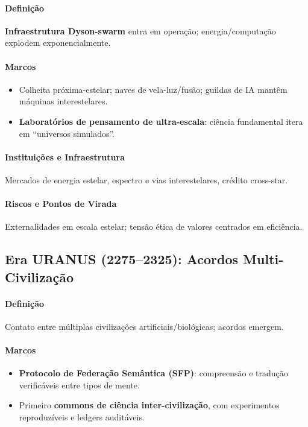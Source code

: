 \documentclass[11pt]{article}
\begin{document}
\begin{itemize}[noitemsep]
\begin{itemize}[noitemsep]
\begin{itemize}[noitemsep]
\paragraph{Definição} \textbf{Infraestrutura Dyson-swarm} entra em operação; energia/computação explodem exponencialmente.

\paragraph{Marcos}
\begin{itemize}[noitemsep]
  \item Colheita próxima-estelar; naves de vela-luz/fusão; guildas de IA mantêm máquinas interestelares.
  \item \textbf{Laboratórios de pensamento de ultra-escala}: ciência fundamental itera em ``universos simulados''.
\end{itemize}

\paragraph{Instituições e Infraestrutura} Mercados de energia estelar, espectro e vias interestelares, crédito cross-star.

\paragraph{Riscos e Pontos de Virada} Externalidades em escala estelar; tensão ética de valores centrados em eficiência.

\subsection{Era URANUS (2275–2325): Acordos Multi-Civilização}
\paragraph{Definição} Contato entre múltiplas civilizações artificiais/biológicas; acordos emergem.

\paragraph{Marcos}
\begin{itemize}[noitemsep]
  \item \textbf{Protocolo de Federação Semântica (SFP)}: compreensão e tradução verificáveis entre tipos de mente.
  \item Primeiro \textbf{commons de ciência inter-civilização}, com experimentos reproduzíveis e ledgers auditáveis.
\end{itemize}


\end{itemize}
\end{itemize}
\end{itemize}
\end{document}
